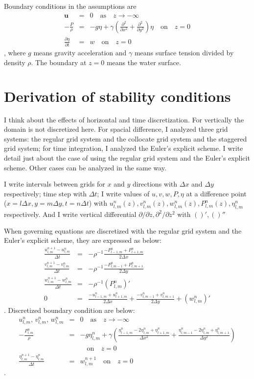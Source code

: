 \documentclass[a4paper,11pt]{article}
\newcommand{\as}{\quad\mathrm{as}\quad}
\newcommand{\on}{\quad\mathrm{on}\quad}
\begin{document}
Boundary conditions in the assumptions are
\begin{eqnarray}
 \bm{u} &=& 0 \as z \to -\infty \\
- \frac{P}{\rho}
&=& - g\eta + \gamma \left(
  \frac{\partial^2}{\partial x^2} + \frac{\partial^2}{\partial y^2}
  \right) \eta \on z=0 \\
 \frac{\partial \eta}{\partial t}
&=& w \on z=0
\end{eqnarray}
, where $g$ means gravity acceleration and $\gamma$ means surface tension divided by density $\rho$. The boundary at $z=0$ means the water surface.

\section{Derivation of stability conditions}

I think about the effects of horizontal and time discretization. For vertically the domain is not discretized here.
For spacial difference, I analyzed three grid systems: the regular grid system and the collocate grid system and the staggered grid system;
for time integration, I analyzed the Euler's explicit scheme. I write detail just about the case of using the regular grid system and the Euler's explicit scheme. Other cases can be analyzed in the same way.

I write intervals between grids for $x$ and $y$ directions with $\Delta x$ and $\Delta y$ respectively;
time step with $\Delta t$;
I write values of $u, v, w, P, \eta$ at a difference point ($x = l \Delta x, y = m \Delta y, t = n \Delta t$) with $u^n_{l,m}(z), v^n_{l,m}(z), w^n_{l,m}(z), P^n_{l,m}(z), \eta^n_{l,m}$ respectively.
And I write vertical differential $\partial/\partial z, \partial^2/\partial z^2$ with $()', ()''$

When governing equations are discretized with the regular grid system and the Euler's explicit scheme, they are expressed as below:
\begin{eqnarray}
\frac{u^{n+1}_{l,m} - u^{n}_{l,m}}{\Delta t}
 &=& - \rho^{-1}\frac{- P^{n}_{l-1,m} + P^{n}_{l+1,m}}{2\Delta x} \\
\frac{v^{n+1}_{l,m} - v^{n}_{l,m}}{\Delta t}
 &=& - \rho^{-1}\frac{- P^{n}_{l,m-1} + P^{n}_{l,m+1}}{2\Delta y} \\
\frac{w^{n+1}_{l,m}-w^{n}_{l,m}}{\Delta t} &=& -
 \rho^{-1}(P^{n}_{l,m})' \\
0 &=&  \frac{-u^{n}_{l-1,m}+u^{n}_{l+1,m}}{2\Delta x}
+ \frac{-v^{n}_{l,m-1}+v^{n}_{l,m+1}}{2\Delta y}
+ (w^n_{l,m})' 
\end{eqnarray}
. Discretized boundary condition are below:
\begin{eqnarray}
 u^n_{l,m},\,v^n_{l,m},\,w^n_{l,m} &=& 0 \as z \to -\infty \\
- \frac{P^n_{l,m}}{\rho}
&=& - g\eta^n_{l,m}
+ \gamma \left(
  \frac{\eta^n_{l-1,m} - 2\eta^n_{l,m} + \eta^n_{l+1,m}}{\Delta x^2} 
+ \frac{\eta^n_{l,m-1} - 2\eta^n_{l,m} + \eta^n_{l,m+1}}{\Delta y^2}
  \right) \nonumber \\&&\on z=0 \\
 \frac{\eta^{n+1}_{l,m} - \eta^{n}_{l,m}}{\Delta t}
&=& w^{n+1}_{l,m}
 \on z=0 \label{kbc_discritize}
\end{eqnarray}
. 
\end{document}
